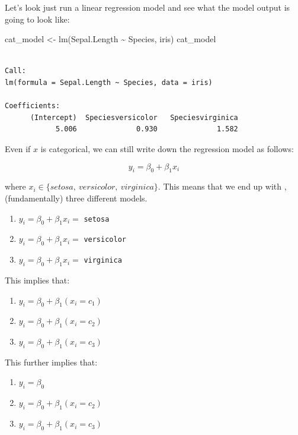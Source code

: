\documentclass[
  letterpaper,
  DIV=11,
  numbers=noendperiod]{scrartcl}
\newenvironment{Shaded}{\begin{snugshade}}{\end{snugshade}}
\newcommand{\FunctionTok}[1]{\textcolor[rgb]{0.28,0.35,0.67}{#1}}
\newcommand{\NormalTok}[1]{\textcolor[rgb]{0.00,0.23,0.31}{#1}}
\newcommand{\OtherTok}[1]{\textcolor[rgb]{0.00,0.23,0.31}{#1}}
\newcommand{\SpecialCharTok}[1]{\textcolor[rgb]{0.37,0.37,0.37}{#1}}
\providecommand{\tightlist}{%
  \setlength{\itemsep}{0pt}\setlength{\parskip}{0pt}}\usepackage{longtable,booktabs,array}
\begin{document}
Let's look just run a linear regression model and see what the model
output is going to look like:

\begin{Shaded}
\begin{Highlighting}[]
\NormalTok{cat\_model }\OtherTok{\textless{}{-}} \FunctionTok{lm}\NormalTok{(Sepal.Length }\SpecialCharTok{\textasciitilde{}}\NormalTok{ Species, iris)}
\NormalTok{cat\_model}
\end{Highlighting}
\end{Shaded}

\begin{verbatim}

Call:
lm(formula = Sepal.Length ~ Species, data = iris)

Coefficients:
      (Intercept)  Speciesversicolor   Speciesvirginica  
            5.006              0.930              1.582  
\end{verbatim}

Even if \(x\) is categorical, we can still write down the regression
model as follows:

\[
y_i = \beta_0 + \beta_1 x_i
\]

where \(x_i \in \{ setosa, \ versicolor, \ virginica \}\). This means
that we end up with , (fundamentally) three different models.

\begin{enumerate}
\def\labelenumi{\arabic{enumi}.}
\tightlist
\item
  \(y_i = \beta_0 + \beta_1 x_i =\) \texttt{setosa}
\item
  \(y_i = \beta_0 + \beta_1 x_i =\) \texttt{versicolor}
\item
  \(y_i = \beta_0 + \beta_1 x_i =\) \texttt{virginica}
\end{enumerate}

This implies that:

\begin{enumerate}
\def\labelenumi{\arabic{enumi}.}
\tightlist
\item
  \(y_i = \beta_0 + \beta_1 (x_i = c_1)\)
\item
  \(y_i = \beta_0 + \beta_1 (x_i = c_2)\)
\item
  \(y_i = \beta_0 + \beta_1 (x_i = c_3)\)
\end{enumerate}

This further implies that:

\begin{enumerate}
\def\labelenumi{\arabic{enumi}.}
\item
  \(y_i = \beta_0\)
\item
  \(y_i = \beta_0 + \beta_1 (x_i = c_2)\)
\item
  \(y_i = \beta_0 + \beta_1 (x_i = c_3)\)
\end{enumerate}
\end{document}
